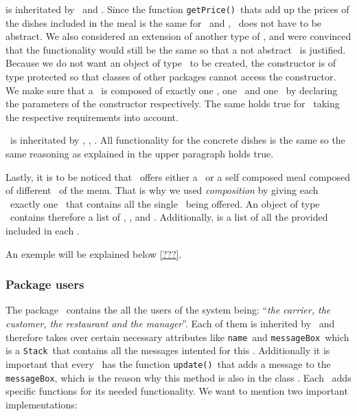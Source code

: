 \Meal is inheritated by \HalfMeal~and \FullMeal. Since the function \lstinline|getPrice()|~thats add up the prices of the dishes included in the meal is the same for \FullMeal~and \HalfMeal, \Meal~does not have to be abstract. We also considered an extension of another type of \Meal, and were convinced that the functionality would still be the same so that a not abstract \Meal~is justified.
Because we do not want an object of type \Meal~to be created, the constructor is of type protected so that classes of other packages cannot access the constructor. We make sure that a \FullMeal~is composed of exactly one \Starter, one \MainDish~and one \Dessert~by declaring the parameters of the constructor respectively. The same holds true for \HalfMeal~taking the respective requirements into account.

\Dish~is inheritated by \Starter, \MainDish, \Dessert. All functionality for the concrete dishes is the same so the same reasoning as explained in the upper paragraph holds true. 

Lastly, it is to be noticed that \Restaurant~offers either a \Meal~or a self composed meal composed of different \Dish~of the menu. 
That is why we used \emph{composition} by giving each \Restaurant~exactly one \Menu~that contains all the single \Dish~being offered.
An object of type \Menu~contains therefore a list of \Starter, \MainDish, and \Dessert. Additionally, is a list of all the provided \Meal included in each \Restaurant.

An exemple will be explained below \ref{???}.


\subsubsection{Package users} %
\label{ssub:users}

The package \users~contains the all the users of the system being: ``\textit{the carrier, the customer, the restaurant and the manager}''.
Each of them is inherited by \User~and therefore takes over certain necessary attributes like \lstinline|name|~and \lstinline|messageBox|~which is a \lstinline|Stack|~that contains all the messages intented for this \User. Additionally it is important that every \User~has the function \lstinline|update()|~that adds a message to the \lstinline|messageBox|, which is the reason why this method is also in the class \User. Each \User~adds specific functions for its needed functionality. We want to mention two important implementations:

